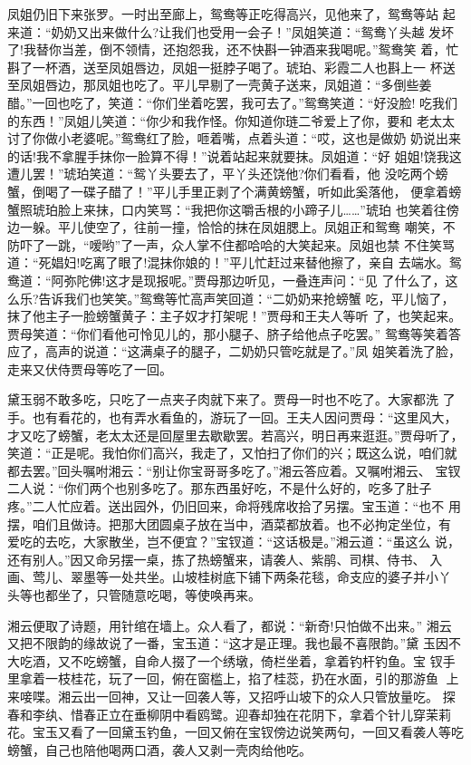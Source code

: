 凤姐仍旧下来张罗。一时出至廊上，鸳鸯等正吃得高兴，见他来了，鸳鸯等站
起来道：“奶奶又出来做什么?让我们也受用一会子！”凤姐笑道：“鸳鸯丫头越
发坏了!我替你当差，倒不领情，还抱怨我，还不快斟一钟酒来我喝呢。”鸳鸯笑
着，忙斟了一杯酒，送至凤姐唇边，凤姐一挺脖子喝了。琥珀、彩霞二人也斟上一
杯送至凤姐唇边，那凤姐也吃了。平儿早剔了一壳黄子送来，凤姐道：“多倒些姜
醋。”一回也吃了，笑道：“你们坐着吃罢，我可去了。”鸳鸯笑道：“好没脸!
吃我们的东西！”凤姐儿笑道：“你少和我作怪。你知道你琏二爷爱上了你，要和
老太太讨了你做小老婆呢。”鸳鸯红了脸，咂着嘴，点着头道：“哎，这也是做奶
奶说出来的话!我不拿腥手抹你一脸算不得！”说着站起来就要抹。凤姐道：“好
姐姐!饶我这遭儿罢！”琥珀笑道：“鸳丫头要去了，平丫头还饶他?你们看看，他
没吃两个螃蟹，倒喝了一碟子醋了！”平儿手里正剥了个满黄螃蟹，听如此奚落他，
便拿着螃蟹照琥珀脸上来抹，口内笑骂：“我把你这嚼舌根的小蹄子儿……”琥珀
也笑着往傍边一躲。平儿使空了，往前一撞，恰恰的抹在凤姐腮上。凤姐正和鸳鸯
嘲笑，不防吓了一跳，“嗳哟”了一声，众人掌不住都哈哈的大笑起来。凤姐也禁
不住笑骂道：“死娼妇!吃离了眼了!混抹你娘的！”平儿忙赶过来替他擦了，亲自
去端水。鸳鸯道：“阿弥陀佛!这才是现报呢。”贾母那边听见，一叠连声问：“见
了什么了，这么乐?告诉我们也笑笑。”鸳鸯等忙高声笑回道：“二奶奶来抢螃蟹
吃，平儿恼了，抹了他主子一脸螃蟹黄子：主子奴才打架呢！”贾母和王夫人等听
了，也笑起来。贾母笑道：“你们看他可怜见儿的，那小腿子、脐子给他点子吃罢。”
鸳鸯等笑着答应了，高声的说道：“这满桌子的腿子，二奶奶只管吃就是了。”凤
姐笑着洗了脸，走来又伏侍贾母等吃了一回。

黛玉弱不敢多吃，只吃了一点夹子肉就下来了。贾母一时也不吃了。大家都洗
了手。也有看花的，也有弄水看鱼的，游玩了一回。王夫人因问贾母：“这里风大，
才又吃了螃蟹，老太太还是回屋里去歇歇罢。若高兴，明日再来逛逛。”贾母听了，
笑道：“正是呢。我怕你们高兴，我走了，又怕扫了你们的兴；既这么说，咱们就
都去罢。”回头嘱咐湘云：“别让你宝哥哥多吃了。”湘云答应着。又嘱咐湘云、
宝钗二人说：“你们两个也别多吃了。那东西虽好吃，不是什么好的，吃多了肚子
疼。”二人忙应着。送出园外，仍旧回来，命将残席收拾了另摆。宝玉道：“也不
用摆，咱们且做诗。把那大团圆桌子放在当中，酒菜都放着。也不必拘定坐位，有
爱吃的去吃，大家散坐，岂不便宜？”宝钗道：“这话极是。”湘云道：“虽这么
说，还有别人。”因又命另摆一桌，拣了热螃蟹来，请袭人、紫鹃、司棋、侍书、
入画、莺儿、翠墨等一处共坐。山坡桂树底下铺下两条花毯，命支应的婆子并小丫
头等也都坐了，只管随意吃喝，等使唤再来。

湘云便取了诗题，用针绾在墙上。众人看了，都说：“新奇!只怕做不出来。”
湘云又把不限韵的缘故说了一番，宝玉道：“这才是正理。我也最不喜限韵。”黛
玉因不大吃酒，又不吃螃蟹，自命人掇了一个绣墩，倚栏坐着，拿着钓杆钓鱼。宝
钗手里拿着一枝桂花，玩了一回，俯在窗槛上，掐了桂蕊，扔在水面，引的那游鱼
上来唼喋。湘云出一回神，又让一回袭人等，又招呼山坡下的众人只管放量吃。
探春和李纨、惜春正立在垂柳阴中看鸥鹭。迎春却独在花阴下，拿着个针儿穿茉莉
花。宝玉又看了一回黛玉钓鱼，一回又俯在宝钗傍边说笑两句，一回又看袭人等吃
螃蟹，自己也陪他喝两口酒，袭人又剥一壳肉给他吃。

